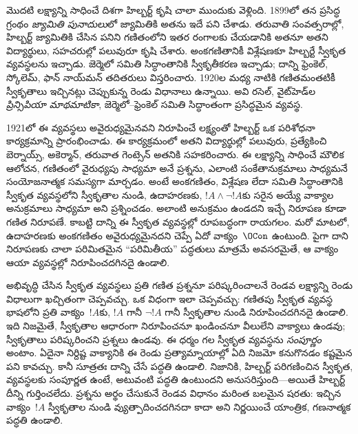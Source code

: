 \documentclass[../../../include/open-logic-section]{subfiles}
\begin{document}
మొదటి లక్ష్యాన్ని సాధించే దిశగా హిల్బర్ట్ కృషి చాలా ముందుకు వెళ్లింది. 1899లో
తన ప్రసిద్ధ గ్రంథం \emph{జ్యామితి పునాదులు}లో జ్యామితికి అతను ఇదే పని చేశాడు.
తరువాతి సంవత్సరాల్లో, హిల్బర్ట్ జ్యామితికి చేసిన పనిని గణితంలోని ఇతర రంగాలకు
చేయడానికి అతనూ అతని విద్యార్థులు, సహచరుల్లో పలువురూ కృషి చేశారు. అంకగణితానికీ
విశ్లేషణకూ హిల్బర్టే స్వీకృత వ్యవస్థలను ఇచ్చాడు. జెర్మెలో సమితి సిద్ధాంతానికి
స్వీకృతీకరణ ఇచ్చాడు; దాన్ని ఫ్రెంకెల్, స్కోలెమ్, ఫాన్ నాయ్‌మన్ తదితరులు
విస్తరించారు. 1920ల మధ్య నాటికి గణితమంతటికీ స్వీకృతాలు ఇచ్చినట్లు చెప్పుకున్న
రెండు విధానాలు ఉన్నాయి. అవి రసెల్, వైట్‌హెడ్‌ల \emph{ప్రిన్సిపియా
మాథమాటికా}, జెర్మెలో--ఫ్రెంకెల్ సమితి సిద్ధాంతంగా ప్రసిద్ధమైన వ్యవస్థ.

1921లో ఈ వ్యవస్థలు అవైరుధ్యమైనవని నిరూపించే లక్ష్యంతో హిల్బర్ట్ ఒక పరిశోధనా
కార్యక్రమాన్ని ప్రారంభించాడు. ఈ కార్యక్రమంలో అతని విద్యార్థుల్లో పలువురు,
ప్రత్యేకించి బెర్నాయ్స్, అకెర్మాన్, తరువాత గెంట్సెన్ అతనికి సహకరించారు. ఈ లక్ష్యాన్ని
సాధించే మౌలిక ఆలోచన, గణితంలో వైరుధ్యపు 
సాధ్యమా అనే ప్రశ్నను, ఎలాంటి సంకేతానుక్రమాలు సాధ్యమనే సంయోజనాత్మక సమస్యగా మార్చడం.
అంటే అంకగణితం, విశ్లేషణ లేదా సమితి సిద్ధాంతానికి స్వీకృత వ్యవస్థలోని స్వీకృతాల
నుండి, ఉదాహరణకు, $!A \land \lnot !A$కు సరైన 
అయ్యే వాక్యాల అనుక్రమాలు సాధ్యమా అని ప్రశ్నించడం. అలాంటి అనుక్రమం ఉండదని ఇచ్చే నిరూపణ కూడా గణిత నిరూపణే. కాబట్టి
దాన్ని ఈ స్వీకృత వ్యవస్థల్లో రూపబద్ధంగా రాయగలం. మరో మాటలో, ఉదాహరణకు అంకగణితం అవైరుధ్యమైనదని చెప్పే
ఏదో వాక్యం~$\OCon$ ఉంటుంది. పైగా దాని నిరూపణకు చాలా పరిమితమైన ``పరిమితీయ''
పద్ధతులు మాత్రమే అవసరమైతే, ఆ వాక్యం ఆయా వ్యవస్థల్లో నిరూపించదగినదై ఉండాలి.

అభివృద్ధి చేసిన స్వీకృత వ్యవస్థలు ప్రతి గణిత ప్రశ్ననూ పరిష్కరించాలనే రెండవ
లక్ష్యాన్ని రెండు విధాలుగా ఖచ్చితంగా చెప్పవచ్చు. ఒక విధంగా ఇలా చెప్పవచ్చు: గణితపు
స్వీకృత వ్యవస్థ భాషలోని ప్రతి వాక్యం~$!A$కు, $!A$ గానీ $\lnot !A$ గానీ
స్వీకృతాల నుండి నిరూపించదగినదై ఉండాలి. ఇది నిజమైతే, స్వీకృతాల ఆధారంగా నిరూపించనూ
ఖండించనూ వీలులేని వాక్యాలు ఉండవు; స్వీకృతాలు పరిష్కరించని ప్రశ్నలు ఉండవు. ఈ
ధర్మం గల స్వీకృత వ్యవస్థను \emph{సంపూర్ణం} అంటాం. ఏదైనా నిర్దిష్ట వాక్యానికి
ఈ రెండు ప్రత్యామ్నాయాల్లో ఏది నిజమో కనుగొనడం కష్టమైన పని కావచ్చు. కానీ సూత్రతః
దాన్ని చేసే పద్ధతి ఉండాలి. నిజానికి, హిల్బర్ట్ పరిగణించిన స్వీకృత,
వ్యవస్థలకు సంపూర్ణత ఉంటే, అటువంటి పద్ధతి ఉంటుందని అనుసరిస్తుంది---అయితే హిల్బర్ట్
దీన్ని గుర్తించలేదు. ప్రశ్నను అర్థం చేసుకునే రెండవ విధానం మరింత బలమైన షరతు:
ఇచ్చిన వాక్యం~$!A$ స్వీకృతాల నుండి వ్యుత్పాదించదగినదా కాదా అని నిర్ణయించే
యాంత్రిక, గణనాత్మక పద్ధతి ఉండాలి.
\end{document}
